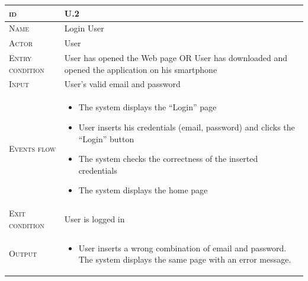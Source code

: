 \begin{table}[H]
    \centering
    \begin{tabular}[c]{|l|p{}|}
        \hline %
    	\textsc{id}                 &   U.2\\
    	\hline %
    	\textsc{Name}               &   Login User\\
    	\hline %
    	\textsc{Actor}             &   User\\
    	\hline %
    	\textsc{Entry condition}   &   User has opened the Web page OR User has downloaded and opened the application on his smartphone\\
    	\hline %
    	\textsc{Input}   &   User’s valid email and password\\
    	\hline %
    	\textsc{Events flow}         &   %
            	                        \begin{itemize}
                                    	    \item The system displays the “Login” page
                                            \item User inserts his credentials (email, password) and clicks the “Login” button
                                            \item The system checks the correctness of the inserted credentials
                                            \item The system displays the home page


                                        \end{itemize}\\
        \hline %
        \textsc{Exit condition}    &  User is logged in\\
    	\hline %
    	\textsc{Output}             &  \begin{itemize}
    	    \item User inserts a wrong combination of email and password. The system displays the same page with an error message.


\end{itemize}
\end{tabular}
\end{table}

